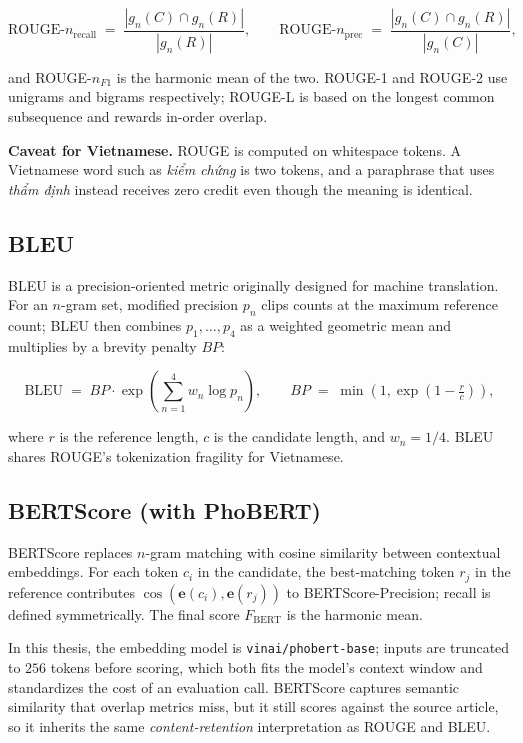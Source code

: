 \[
\text{ROUGE-}n_{\text{recall}} \;=\; \frac{|g_n(C) \cap g_n(R)|}{|g_n(R)|},
\qquad
\text{ROUGE-}n_{\text{prec}} \;=\; \frac{|g_n(C) \cap g_n(R)|}{|g_n(C)|},
\]

\noindent and ROUGE-$n_{F1}$ is the harmonic mean of the two.
ROUGE-1 and ROUGE-2 use unigrams and bigrams respectively; ROUGE-L is
based on the longest common subsequence and rewards in-order overlap.

\textbf{Caveat for Vietnamese.} ROUGE is computed on whitespace tokens.
A Vietnamese word such as \textit{kiểm chứng} is two tokens, and a paraphrase
that uses \textit{thẩm định} instead receives zero credit even though the
meaning is identical.

\subsection{BLEU}

BLEU is a precision-oriented metric originally designed for machine
translation. For an $n$-gram set, modified precision $p_n$ clips counts at
the maximum reference count; BLEU then combines $p_1, \ldots, p_4$ as a
weighted geometric mean and multiplies by a brevity penalty $BP$:

\[
\text{BLEU} \;=\; BP \cdot \exp\!\left(\sum_{n=1}^{4} w_n \log p_n \right),
\qquad
BP \;=\; \min\!\left(1, \exp\!\left(1 - \tfrac{r}{c}\right)\right),
\]

\noindent where $r$ is the reference length, $c$ is the candidate length,
and $w_n = 1/4$. BLEU shares ROUGE's tokenization fragility for Vietnamese.

\subsection{BERTScore (with PhoBERT)}

BERTScore \cite{Zhang2020} replaces $n$-gram matching with cosine similarity
between contextual embeddings. For each token $c_i$ in the candidate, the
best-matching token $r_j$ in the reference contributes
$\cos(\mathbf{e}(c_i), \mathbf{e}(r_j))$ to BERTScore-Precision; recall is
defined symmetrically. The final score $F_{\text{BERT}}$ is the harmonic
mean.

In this thesis, the embedding model is \texttt{vinai/phobert-base}; inputs
are truncated to $256$ tokens before scoring, which both fits the model's
context window and standardizes the cost of an evaluation call.
BERTScore captures semantic similarity that overlap metrics miss, but it
still scores against the source article, so it inherits the same
\textit{content-retention} interpretation as ROUGE and BLEU.

